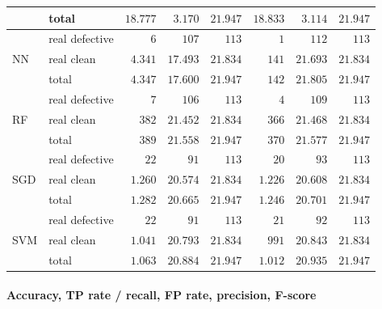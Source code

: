 \begin{table}[t]
{\begin{tabular}{llrrrrrr}
                     & total          & $18.777$  & $3.170$   & $21.947$                 & $18.833$  & $3.114$   & $21.947$                  \\ 
\midrule
\multirow{3}{*}{NN}  & real defective & $6$       & $107$     & $113$                    & $1$       & $112$     & $113$                     \\
                     & real clean     & $4.341$   & $17.493$  & $21.834$                 & $141$     & $21.693$  & $21.834$                  \\
                     & total          & $4.347$   & $17.600$  & $21.947$                 & $142$     & $21.805$  & $21.947$                  \\ 
\midrule
\multirow{3}{*}{RF}  & real defective & $7$       & $106$     & $113$                    & $4$       & $109$     & $113$                     \\
                     & real clean     & $382$     & $21.452$  & $21.834$                 & $366$     & $21.468$  & $21.834$                  \\
                     & total          & $389$     & $21.558$  & $21.947$                 & $370$     & $21.577$  & $21.947$                  \\ 
\midrule
\multirow{3}{*}{SGD} & real defective & $22$      & $91$      & $113$                    & $20$      & $93$      & $113$                     \\
                     & real clean     & $1.260$   & $20.574$  & $21.834$                 & $1.226$   & $20.608$  & $21.834$                  \\
                     & total          & $1.282$   & $20.665$  & $21.947$                 & $1.246$   & $20.701$  & $21.947$                  \\ 
\midrule
\multirow{3}{*}{SVM} & real defective & $22$      & $91$      & $113$                    & $21$      & $92$      & $113$                     \\
                     & real clean     & $1.041$   & $20.793$  & $21.834$                 & $991$     & $20.843$  & $21.834$                  \\
                     & total          & $1.063$   & $20.884$  & $21.947$                 & $1.012$   & $20.935$  & $21.947$                  \\
\bottomrule
\end{tabular}
}
\end{table}

\paragraph{Accuracy, TP rate / recall, FP rate, precision, F-score}

